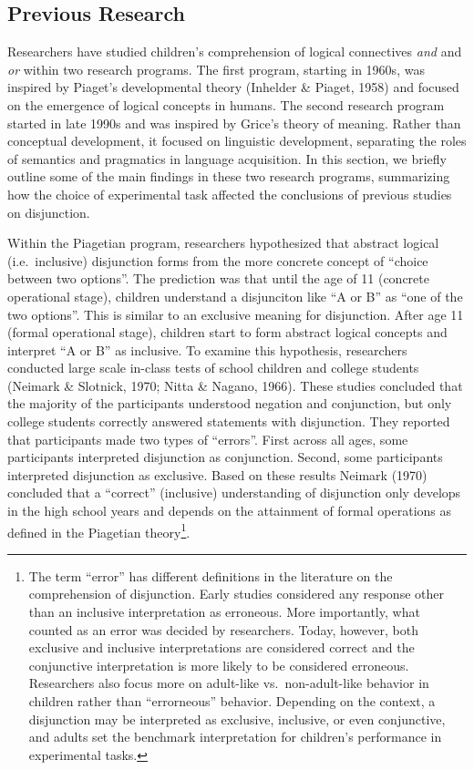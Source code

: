 \documentclass[floatsintext,man]{apa6}
\theoremstyle{definition}
\theoremstyle{definition}
\theoremstyle{definition}
\theoremstyle{remark}
\begin{document}
\subsection{Previous Research}\label{litreview}

Researchers have studied children's comprehension of logical connectives
\emph{and} and \emph{or} within two research programs. The first
program, starting in 1960s, was inspired by Piaget's developmental
theory (Inhelder \& Piaget, 1958) and focused on the emergence of
logical concepts in humans. The second research program started in late
1990s and was inspired by Grice's theory of meaning. Rather than
conceptual development, it focused on linguistic development, separating
the roles of semantics and pragmatics in language acquisition. In this
section, we briefly outline some of the main findings in these two
research programs, summarizing how the choice of experimental task
affected the conclusions of previous studies on disjunction.

Within the Piagetian program, researchers hypothesized that abstract
logical (i.e.~inclusive) disjunction forms from the more concrete
concept of \enquote{choice between two options}. The prediction was that
until the age of 11 (concrete operational stage), children understand a
disjunciton like \enquote{A or B} as \enquote{one of the two options}.
This is similar to an exclusive meaning for disjunction. After age 11
(formal operational stage), children start to form abstract logical
concepts and interpret \enquote{A or B} as inclusive. To examine this
hypothesis, researchers conducted large scale in-class tests of school
children and college students (Neimark \& Slotnick, 1970; Nitta \&
Nagano, 1966). These studies concluded that the majority of the
participants understood negation and conjunction, but only college
students correctly answered statements with disjunction. They reported
that participants made two types of \enquote{errors}. First across all
ages, some participants interpreted disjunction as conjunction. Second,
some participants interpreted disjunction as exclusive. Based on these
results Neimark (1970) concluded that a \enquote{correct} (inclusive)
understanding of disjunction only develops in the high school years and
depends on the attainment of formal operations as defined in the
Piagetian theory\footnote{The term \enquote{error} has different
  definitions in the literature on the comprehension of disjunction.
  Early studies considered any response other than an inclusive
  interpretation as erroneous. More importantly, what counted as an
  error was decided by researchers. Today, however, both exclusive and
  inclusive interpretations are considered correct and the conjunctive
  interpretation is more likely to be considered erroneous. Researchers
  also focus more on adult-like vs.~non-adult-like behavior in children
  rather than \enquote{errorneous} behavior. Depending on the context, a
  disjunction may be interpreted as exclusive, inclusive, or even
  conjunctive, and adults set the benchmark interpretation for
  children's performance in experimental tasks.}.
\end{document}
